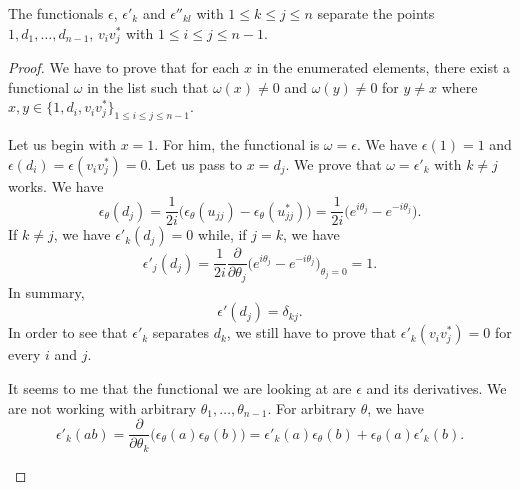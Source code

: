 \begin{proposition}
    The functionals $\epsilon$, $\epsilon'_{k}$ and $\epsilon''_{kl}$ with $1\leq k\leq j\leq n$ separate the points $1,d_1,\ldots,d_{n-1}$, $v_iv_j^*$ with $1\leq i\leq j\leq n-1$.
\end{proposition}

\begin{proof}
    We have to prove that for each $x$ in the enumerated elements, there exist a functional $\omega$ in the list such that $\omega(x)\neq 0$ and $\omega(y)\neq 0$ for $y\neq x$ where $x,y\in\{ 1,d_i,v_iv_j^* \}_{1\leq i\leq j\leq n-1}$.

    Let us begin with $x=1$. For him, the functional is $\omega=\epsilon$. We have $\epsilon(1)=1$ and $\epsilon(d_i)=\epsilon(v_iv_j^*)=0$. Let us pass to $x=d_j$. We prove that $\omega=\epsilon'_k$ with $k\neq j$ works. We have
    \begin{equation}
        \epsilon_{\theta}(d_j)=\frac{1}{ 2i }\big( \epsilon_{\theta}(u_{jj})-\epsilon_{\theta}(u_{jj}^*) \big)=\frac{1}{ 2i }\big(  e^{i\theta_j}- e^{-i\theta_j} \big).
    \end{equation}
    If $k\neq j$, we have $\epsilon'_k(d_j)=0$ while, if $j=k$, we have
    \begin{equation}
        \epsilon'_j(d_j)=\frac{1}{ 2i }\frac{ \partial  }{ \partial \theta_j }\big(  e^{i\theta_j}- e^{-i\theta_j} \big)_{\theta_j=0}=1.
    \end{equation}
    In summary,
    \begin{equation}
        \epsilon'(d_j)=\delta_{kj}.
    \end{equation}
    In order to see that $\epsilon'_k$ separates $d_k$, we still have to prove that $\epsilon'_k(v_iv_j^*)=0$ for every $i$ and $j$.

    \begin{probleme}
        It seems to me that the functional we are looking at are $\epsilon$ and its derivatives. We are not working with arbitrary $\theta_1,\ldots,\theta_{n-1}$. For arbitrary $\theta$, we have
        \begin{equation}
            \epsilon'_k(ab)=\frac{ \partial  }{ \partial \theta_k }\big( \epsilon_{\theta}(a)\epsilon_{\theta}(b) \big)=\epsilon'_k(a)\epsilon_{\theta}(b)+\epsilon_{\theta}(a)\epsilon'_k(b).
        \end{equation}
    \end{probleme}
\end{proof}

